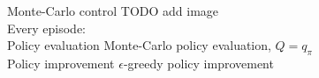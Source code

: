 \bgroup
\begin{frame}{Monte-Carlo control}
TODO add image \\

\textcolor{mImagelabRed}{Every episode:}\\
\textcolor{mImagelabRed}{Policy evaluation} Monte-Carlo policy evaluation, $Q=q_{\pi}$\\
\textcolor{mImagelabRed}{Policy improvement} $\epsilon$-greedy policy improvement
\end{frame}
\egroup
